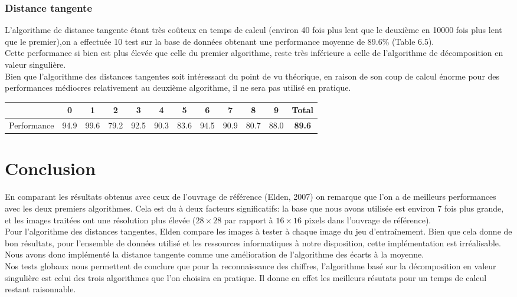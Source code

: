 \documentclass[a4paper,11pt,twoside]{report}
\begin{document}
\subsection{Distance tangente}
L’algorithme de distance tangente étant très coûteux en temps de calcul (environ 40 fois plus lent que le deuxième en 10000 fois plus lent que le premier),on a effectuée 10 test sur la base de données obtenant une performance moyenne de 89.6\% (Table 6.5).\\
Cette performance si bien est plus élevée que celle du premier algorithme, reste très inférieure a celle de l'algorithme de décomposition en valeur singulière.\\ Bien que l'algorithme des distances tangentes soit intéressant du point de vu théorique, en raison de son coup de calcul énorme pour des performances médiocres relativement au deuxième algorithme, il ne sera pas utilisé en pratique.

\begin{center}
\begin{tabular}{ |c||c|c|c|c|c|c|c|c|c|c|c| } 
 \hline
   & 0 & 1 & 2 & 3 & 4 & 5 & 6 & 7 & 8 & 9 & \textbf{Total} \\ 
  \hline
  \hline
 Performance & 94.9 & 99.6 & 79.2 & 92.5 & 90.3 & 83.6 & 94.5 & 90.9 & 80.7 & 88.0 &  \textbf{89.6} \\

 \hline
\end{tabular}
\end{center}


\chapter{Conclusion}
En comparant les résultats obtenus avec ceux de l'ouvrage de référence (Elden, 2007) on remarque que l'on a de meilleurs performances avec les deux premiers algorithmes. Cela est du à deux facteurs significatifs: la base que nous avons utilisée est environ 7 fois plus grande, et les images traitées ont une résolution plus élevée ($28\times 28$ par rapport à $16\times 16$ pixels dans l'ouvrage de référence).\\
Pour l'algorithme des distances tangentes, Elden compare les images à tester à chaque image du jeu d'entraînement. Bien que cela donne de bon résultats, pour l'ensemble de données utilisé et les ressources informatiques à notre disposition, cette implémentation est irréalisable. Nous avons donc implémenté la distance tangente comme une amélioration de l'algorithme des écarts à la moyenne.\\
Nos tests globaux nous permettent de conclure que pour la reconnaissance des chiffres, l'algorithme basé sur la décomposition en valeur singulière est celui des trois algorithmes que l'on choisira en pratique. Il donne en effet les meilleurs résutats pour un temps de calcul restant raisonnable.



\end{document}
